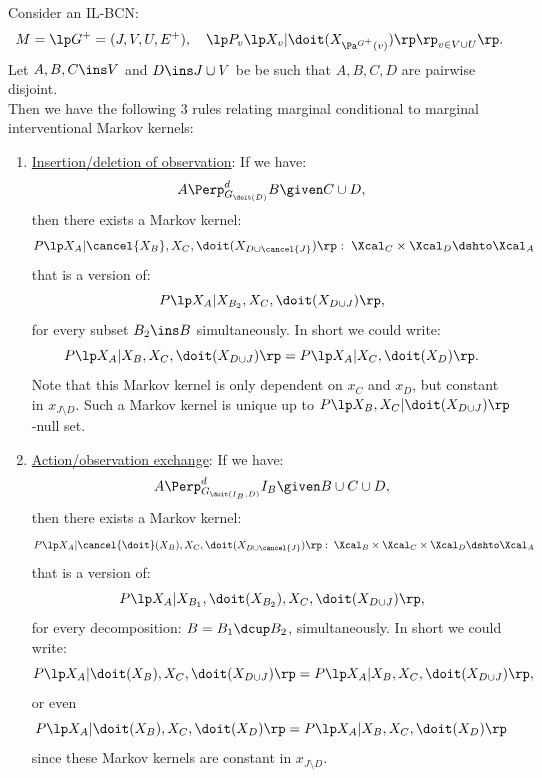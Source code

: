\begin{Cor}[Do-calculus]\label{cor:do-calculus}
    Consider an IL-BCN:
    \[ M = \lp G^+=(J,V,U,E^+),\quad \lp P_v\lp X_v|\doit(X_{\Pa^{G^+}(v)})   \rp\rp_{v\in V \cup U} \rp. \]
    Let $A,B,C \ins V$ and $D \ins J \cup V$ be be such that $A,B,C,D$ are pairwise disjoint.\\
    Then we have the following 3 rules relating marginal conditional to marginal interventional Markov kernels:
    \begin{enumerate}
        \item \underline{Insertion/deletion of observation}: If we have:
            \[ A \Perp^d_{G_{\doit(D)}} B \given C \cup D,   \]
            then there exists a Markov kernel:
            \[ P\lp X_A|\cancel{X_B},X_C,\doit(X_{D\cup \cancel{J}})\rp:\;  \Xcal_C \times \Xcal_{D} \dshto \Xcal_A \]
            that is a version of:
            \[P\lp X_A|X_{B_2},X_C,\doit(X_{D\cup J})\rp,\] 
            for every subset $B_2 \ins B$ simultaneously.
            In short we could write:
            \[ P\lp X_A|X_B,X_C,\doit(X_{D\cup J})\rp = P\lp X_A|X_C,\doit(X_D)\rp.\]
            Note that this Markov kernel is only dependent on $x_C$ and $x_{D}$, but constant in $x_{J\setminus D}$.
            Such a Markov kernel is unique up to $P\lp X_B,X_C|\doit(X_{D\cup J})\rp$-null set.
         \item \underline{Action/observation exchange}: If we have:
            \[ A \Perp^d_{G_{\doit(I_B,D)}} I_B \given B \cup C \cup D,   \]
            then there exists a Markov kernel:
            \[P\lp X_A|\cancel{\doit}(X_B),X_C,\doit(X_{D\cup \cancel{J}})\rp: \;\Xcal_B \times \Xcal_C \times \Xcal_{D} \dshto \Xcal_A\]
            that is a version of:            
            \[ P\lp X_A|X_{B_1},\doit(X_{B_2}),X_C,\doit(X_{D\cup J})\rp, \]
            for every decomposition: $B=B_1\dcup B_2$, simultaneously. In short we could write:
            \[ P\lp X_A|\doit(X_B),X_C,\doit(X_{D\cup J})\rp  =  P\lp X_A|X_B,X_C,\doit(X_{D\cup J})\rp,\]
            or even
            \[ P\lp X_A|\doit(X_B),X_C,\doit(X_D)\rp  =  P\lp X_A|X_B,X_C,\doit(X_D)\rp\]
            since these Markov kernels are constant in $x_{J\setminus D}$.

\end{enumerate}
\end{Cor}
